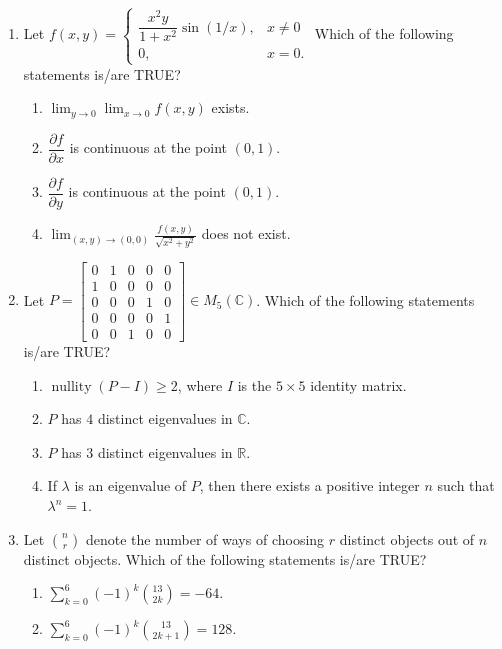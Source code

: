 \begin{enumerate}
\begin{enumerate}[label=(\Alph*)]
\item $\dfrac1{xy}$
\item $xy$
\item $\sec x$
\item $\sqrt{\sec x}$
\end{enumerate}
\item Let $f(x,y)=\begin{cases}\dfrac{x^2y}{1+x^2}\sin(1/x),&x\ne0\\0,&x=0.\end{cases}$ Which of the following statements is/are TRUE?
\begin{enumerate}[label=(\Alph*)]
\item $\displaystyle\lim_{y\to0}\lim_{x\to0}f(x,y)$ exists.
\item $\dfrac{\partial f}{\partial x}$ is continuous at the point $(0,1)$.
\item $\dfrac{\partial f}{\partial y}$ is continuous at the point $(0,1)$.
\item $\displaystyle\lim_{(x,y)\to(0,0)}\frac{f(x,y)}{\sqrt{x^2+y^2}}$ does not exist.
\end{enumerate}
\item Let $P=\begin{bmatrix}0&1&0&0&0\\1&0&0&0&0\\0&0&0&1&0\\0&0&0&0&1\\0&0&1&0&0\end{bmatrix}\in M_5(\mathbb C)$. Which of the following statements is/are TRUE?
\begin{enumerate}[label=(\Alph*)]
\item $\operatorname{nullity}(P-I)\ge2$, where $I$ is the $5\times5$ identity matrix.
\item $P$ has $4$ distinct eigenvalues in $\mathbb C$.
\item $P$ has $3$ distinct eigenvalues in $\mathbb R$.
\item If $\lambda$ is an eigenvalue of $P$, then there exists a positive integer $n$ such that $\lambda^n=1$.
\end{enumerate}
\item Let $\binom nr$ denote the number of ways of choosing $r$ distinct objects out of $n$ distinct objects. Which of the following statements is/are TRUE?
\begin{enumerate}[label=(\Alph*)]
\item $\displaystyle\sum_{k=0}^6(-1)^k\binom{13}{2k}=-64$.
\item $\displaystyle\sum_{k=0}^6(-1)^k\binom{13}{2k+1}=128$.

\end{enumerate}
\end{enumerate}
